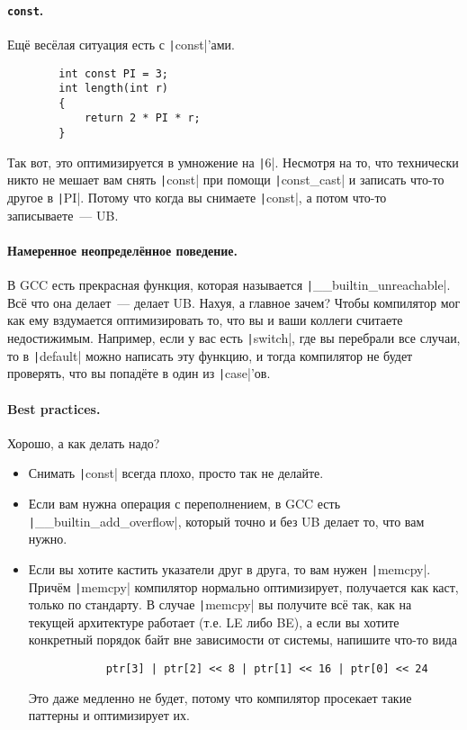 \documentclass{article}
\begin{document}
    \paragraph{\texttt{const}.}
    Ещё весёлая ситуация есть с \texttt|const|'ами.
    \begin{verbatim}
        int const PI = 3;
        int length(int r)
        {
            return 2 * PI * r;
        }
    \end{verbatim}
    Так вот, это оптимизируется в умножение на \texttt|6|. Несмотря на то, что технически никто не мешает вам снять \texttt|const| при помощи \texttt|const_cast| и записать что-то другое в \texttt|PI|. Потому что когда вы снимаете \texttt|const|, а потом что-то записываете~--- UB.
    \paragraph{Намеренное неопределённое поведение.}
    В GCC есть прекрасная функция, которая называется \texttt|__builtin_unreachable|. Всё что она делает~--- делает UB. Нахуя, а главное зачем? Чтобы компилятор мог как ему вздумается оптимизировать то, что вы и ваши коллеги считаете недостижимым. Например, если у вас есть \texttt|switch|, где вы перебрали все случаи, то в \texttt|default| можно написать эту функцию, и тогда компилятор не будет проверять, что вы попадёте в один из \texttt|case|'ов.
    \paragraph{Best practices.}
    Хорошо, а как делать надо?
    \begin{itemize}
        \item Снимать \texttt|const| всегда плохо, просто так не делайте.
        \item Если вам нужна операция с переполнением, в GCC есть \texttt|__builtin_add_overflow|, который точно и без UB делает то, что вам нужно.
        \item Если вы хотите кастить указатели друг в друга, то вам нужен \texttt|memcpy|. Причём \texttt|memcpy| компилятор нормально оптимизирует, получается как каст, только по стандарту. В случае \texttt|memcpy| вы получите всё так, как на текущей архитектуре работает (т.е. LE либо BE), а если вы хотите конкретный порядок байт вне зависимости от системы, напишите что-то вида
        \begin{verbatim}
            ptr[3] | ptr[2] << 8 | ptr[1] << 16 | ptr[0] << 24
        \end{verbatim}
        Это даже медленно не будет, потому что компилятор просекает такие паттерны и оптимизирует их.
    \end{itemize}
\end{document}
